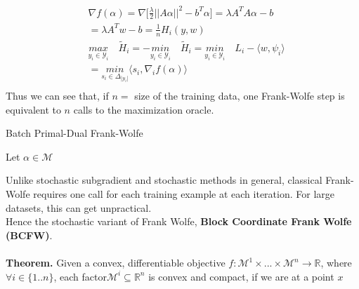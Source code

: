 \documentclass{article}
\begin{document}
\begin{equation*}
\begin{aligned}
    &\nabla f(\alpha)= \nabla\Big[\frac{\lambda}{2}||A\alpha||^{2}- b^{T}\alpha\Big] = \lambda A^{T}A\alpha- b\\
    &= \lambda A^{T}w- b= \frac{1}{n}H_{i}(y,w)\\
    &\underset{y_{i}\in\mathcal{Y}_{i}}{\textit{max}}\quad\tilde{H}_{i}= -\underset{y_{i}\in\mathcal{Y}_{i}}{\textit{min}}\quad\tilde{H}_{i} = \underset{y_{i}\in\mathcal{Y}_{i}}{\textit{min}}\quad L_{i}- \langle w, \psi_{i}\rangle\\
    &= \underset{s_{i}\in\Delta_{|\mathcal{Y}_{i}|}}{\textit{min}}\langle s_{i}, \nabla_{i} f(\alpha)\rangle\\
\end{aligned}
\end{equation*}
Thus we can see that, if $n=$ size of the training data, one Frank-Wolfe step is equivalent to $n$ calls to the maximization oracle.
\begin{algorithm}[tb]
   \caption{Batch Primal-Dual Frank-Wolfe}
   \label{alg:example}
\begin{algorithmic}
   \STATE Let $\alpha\in\mathcal{M}$
    \\
   \ENDFOR
   \ENDFOR
\end{algorithmic}
\end{algorithm}
Unlike stochastic subgradient and stochastic methods in general, classical Frank-Wolfe requires one call for each training example at each iteration. For large datasets, this can get unpractical.\\
Hence the stochastic variant of Frank Wolfe, \textbf{Block Coordinate Frank Wolfe (BCFW)}.
\\
\\
\textbf{Theorem.} Given a convex, differentiable objective $f:\mathcal{M}^{1}\times...\times\mathcal{M}^{n}\to\mathbb{R}$, where $\forall i\in\{1..n\}$, each factor\quad $\mathcal{M}^{i}\subseteq\mathbb{R}^{n}$ is convex and compact, if we are at a point $x$
\end{document}
